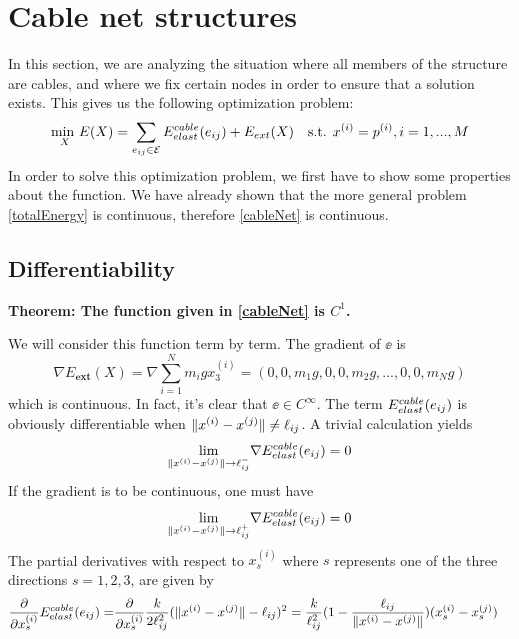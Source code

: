 \section{Cable net structures}
In this section, we are analyzing the situation where all members of the structure are cables, and where we fix certain nodes in order to ensure that a solution exists. This gives us the following optimization problem:
\begin{equation}
    \underset{X}{\text{min }} E(X) = \sum\limits_{e_{ij} \in \mathcal{E}} E^{cable}_{elast}(e_{ij}) + E_{ext}(X) \quad \text{s.t. } x^{(i)} = p^{(i)}, i = 1,...,M
    \label{cableNet}
\end{equation}
In order to solve this optimization problem, we first have to show some properties about the function. We have already shown that the more general problem \eqref{totalEnergy} is continuous, therefore \eqref{cableNet} is continuous.

\subsection{Differentiability}
\textbf{Theorem: The function given in \eqref{cableNet} is $C^1$.}

We will consider this function term by term.
The gradient of $\ee$ is 
\begin{equation}
    \nabla E_{\textbf{ext}}(X) = \nabla \sum_{i=1}^N m_i g x_3^{(i)}
    = (0,0,m_1 g, 0,0,m_2 g,...,0,0,m_N g)
    \label{gradient_external_force}
\end{equation}
which is continuous. In fact, it's clear that $\ee \in C^{\infty}$. The term $E^{cable}_{elast}(e_{ij})$ is obviously differentiable when $\lVert x^{(i)} - x^{(j)}\rVert \neq \ell_{ij}$. A trivial calculation yields
\begin{equation}
    \underset{\lVert x^{(i)} - x^{(j)}\rVert \to \ell_{ij} ^-}{\text{lim}} \nabla E^{cable}_{elast}(e_{ij}) = 0    
\end{equation}
If the gradient is to be continuous, one must have
\begin{equation}
    \underset{\lVert x^{(i)} - x^{(j)}\rVert \to \ell_{ij} ^+}{\text{lim}} \nabla E^{cable}_{elast}(e_{ij}) = 0    
\end{equation}
The partial derivatives with respect to $x_s^{(i)}$ where $s$ represents one of the three directions $s=1,2,3$, are given by
\begin{align}
    \frac{\partial}{\partial x_s^{(i)}} E^{cable}_{elast}(e_{ij}) = &\frac{\partial}{\partial x_s^{(i)}}  \frac{k}{2 \ell_{ij}^2} (\lVert x^{(i)} - x^{(j)}\rVert - \ell_{ij})^2 = \frac{k}{\ell_{ij}^2} (1- \frac{\ell_{ij}}{\lVert x^{(i)} - x^{(j)}\rVert}) (x_s^{(i)} - x_s^{(j)})
\end{align}

